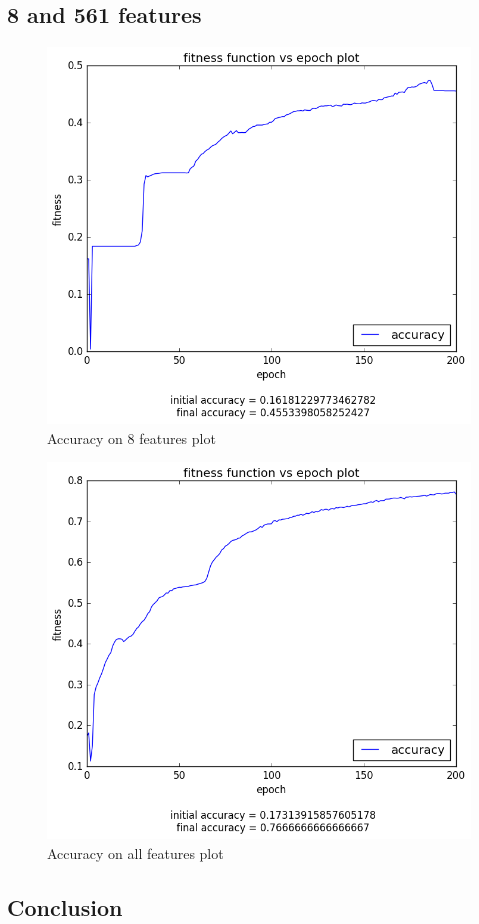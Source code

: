 \documentclass[12pt,a4paper]{article}
\begin{document}
\subsection{8 and 561 features}
\begin{figure}[H]
\centering
\includegraphics[scale=0.4]{img/8_3_acc.png}
\caption{Accuracy on 8 features plot}
\end{figure}
\begin{figure}[H]
\centering
\includegraphics[scale=0.4]{img/all_3_acc.png}
\caption{Accuracy on all features plot}
\end{figure}

\subsection{Conclusion}


 
\end{document}
